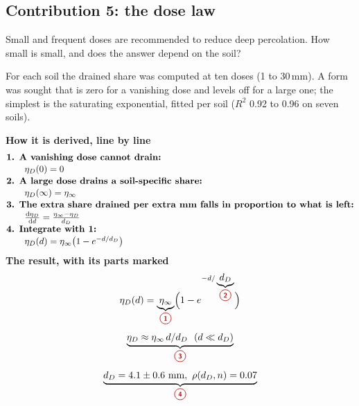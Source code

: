 \subsection{Contribution 5: the dose law}\label{con:s4:5}
\begin{problem}
Small and frequent doses are recommended to reduce deep percolation. How small is small, and does the answer depend on the soil?
\end{problem}
\begin{derivation}
For each soil the drained share was computed at ten doses (1 to 30\,mm). A form was sought that is zero for a vanishing dose and levels off for a large one; the simplest is the saturating exponential, fitted per soil ($R^2$ 0.92 to 0.96 on seven soils).
\end{derivation}
\begin{keyresult}
\begin{pencil}
{\small\noindent\textbf{How it is derived, line by line}
\[\begin{array}{@{}l@{}}\textbf{1. A vanishing dose cannot drain:}\\[1pt]
\qquad \eta_D(0)=0\\[1pt]
\textbf{2. A large dose drains a soil-specific share:}\\[1pt]
\qquad \eta_D(\infty)=\eta_\infty\\[1pt]
\textbf{3. The extra share drained per extra mm falls in proportion to what is left:}\\[1pt]
\qquad \frac{\dd\eta_D}{\dd d}=\frac{\eta_\infty-\eta_D}{d_D}\\[1pt]
\textbf{4. Integrate with 1:}\\[1pt]
\qquad \eta_D(d)=\eta_\infty\bigl(1-e^{-d/d_D}\bigr)
\end{array}\]}
\noindent\textbf{The result, with its parts marked}
\[\eta_D(d)=\underbrace{\eta_\infty}_{\circled{1}}\Bigl(1-e^{-d/\underbrace{d_D}_{\circled{2}}}\Bigr)\]
\[\underbrace{\eta_D\approx\eta_\infty\,d/d_D\ \ (d\ll d_D)}_{\circled{3}}\]
\[\underbrace{d_D=4.1\pm0.6\text{ mm},\ \rho(d_D,n)=0.07}_{\circled{4}}\]
\end{pencil}
\end{keyresult}
\begin{pins}
\end{pins}


